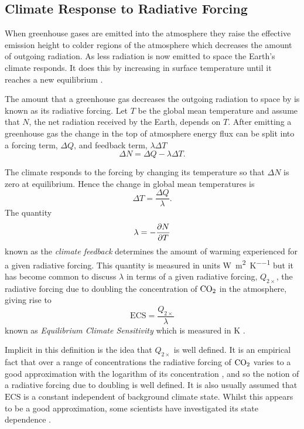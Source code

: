 \subsection{Climate Response to Radiative Forcing}
When greenhouse gases are emitted into the atmosphere they raise the effective emission height to colder regions of the atmosphere which
decreases the amount of outgoing radiation. As less radiation is now emitted to space the Earth's climate responds. It does this by increasing in surface temperature
until it reaches a new equilibrium \parencite{Manabe1967,Pierrehumbert2010}. 

The amount that a greenhouse gas decreases the outgoing radiation to space by is known as its radiative forcing. Let $T$ be
the global mean temperature and assume that $N$, the net radiation received by the Earth, depends on $T$. After emitting a greenhouse gas
the change in the top of atmosphere energy flux can be split \parencite{Gregory2004} into a forcing term, $\Delta Q$, and feedback term, $\lambda \Delta T$
\begin{equation}
  \label{eq:deltaN}
  \Delta N = \Delta Q - \lambda \Delta T.
\end{equation}

The climate responds to the forcing by changing its temperature so that $\Delta N$ is zero at equilibrium. Hence the change in global mean temperatures is
\begin{equation}
  \label{eq:response_to_radiative_forcing}
  \Delta T = \frac{\Delta Q}{\lambda}.
\end{equation}
The quantity
\begin{equation}
  \label{eq:climate_sensitivity}
  \lambda = -\pdv{N}{T}
\end{equation}
known as the \emph{climate feedback} determines the amount of warming experienced for a given radiative forcing. This quantity is measured
in units \si{\watt\per\square\meter\per\kelvin} but it has become common to discuss $\lambda$ in terms of a given radiative forcing, $Q_{2\times}$,
the radiative forcing due to doubling the concentration of $\ce{CO2}$ in the atmosphere, giving rise to
\begin{equation}
  \label{eq:definition_of_ECS}
  \mathrm{ECS} = \frac{Q_{2\times}}{\lambda}
\end{equation}
known as \emph{Equilibrium Climate Sensitivity} which is measured in \si{\kelvin} \parencite{Charney1979}.

Implicit in this definition is the idea that $Q_{2\times}$ is well defined. It is an empirical fact that over a range of concentrations the radiative forcing
of $\ce{CO2}$ varies to a good approximation with the logarithm of its concentration \parencite{Pierrehumbert2010}, and so the notion of a radiative forcing due to doubling is well defined.
It is also usually assumed that $\mathrm{ECS}$ is a constant independent of background climate state. Whilst this appears to be a good approximation, some scientists
have investigated its state dependence \parencite{Ashwin2019,Caballero2013,Bloch-Johnson2021}.

